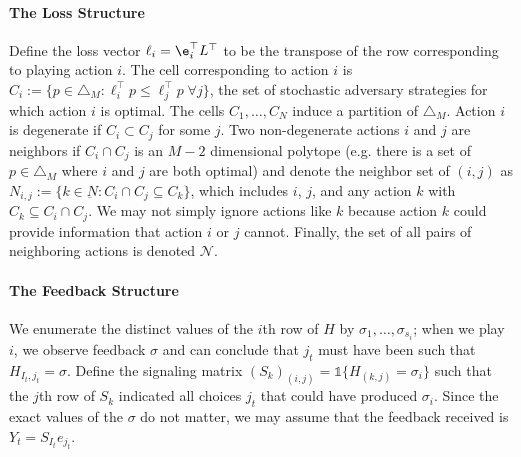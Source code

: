 \documentclass{article}
\begin{document}
\paragraph{The Loss Structure} Define the loss vector $\ell_i = \e_i^\top L^\top$ to be the transpose of the row corresponding to playing action $i$. The cell corresponding to action $i$ is $C_i:=\{ p \in \triangle_M: \ell_i^\top p \leq \ell_j^\top p\; \forall j\}$, the set of stochastic adversary strategies for which action $i$ is optimal. The cells $C_1,\ldots, C_N$ induce a partition of $\triangle_M$. Action $i$ is degenerate if $C_i \subset C_j$ for some $j$. Two non-degenerate actions $i$ and $j$ are neighbors if $C_i\cap C_j$ is an $M-2$ dimensional polytope (e.g. there is a set of $p\in\triangle_M$ where $i$ and $j$ are both optimal) and denote the neighbor set of $(i,j)$ as $N_{i,j} := \{k\in\underbar N : C_i\cap C_j\subseteq C_k\}$, which includes $i$, $j$, and any action $k$ with $C_k \subseteq C_i\cap C_j$. We may not simply ignore actions like $k$ because action $k$ could provide information that action $i$ or $j$ cannot. Finally, the set of all pairs of neighboring actions is denoted $\mathcal N$.

\paragraph{The Feedback Structure}
We enumerate the distinct values of the $i$th row of $H$ by $\sigma_1,\ldots,\sigma_{s_i}$; when we play $i$, we observe feedback $\sigma$ and can conclude that $j_t$ must have been such that $H_{I_t,j_t} = \sigma$. Define the signaling matrix $(S_k)_{(i,j)} = \mathds{1}\{H_{(k,j)} = \sigma_i\}$ such that the $j$th row of $S_{k}$ indicated all choices $j_t$ that could have produced $\sigma_i$. Since the exact values of the $\sigma$ do not matter, we may assume that the feedback received is $Y_t = S_{I_t}e_{j_t}$.
\end{document}
